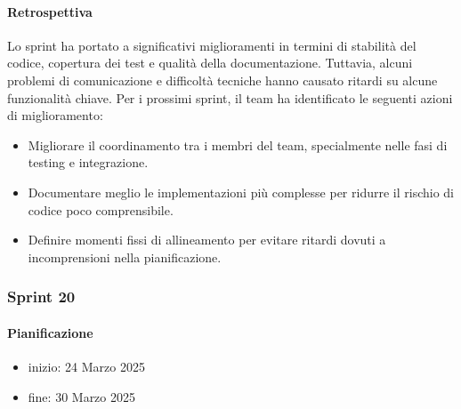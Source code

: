 \documentclass{article}
\begin{document}
            \paragraph{Retrospettiva}
            Lo sprint ha portato a significativi miglioramenti in termini di stabilità del codice, copertura dei test e qualità della documentazione. Tuttavia, alcuni problemi di comunicazione e difficoltà tecniche hanno causato ritardi su alcune funzionalità chiave. Per i prossimi sprint, il team ha identificato le seguenti azioni di miglioramento:
            \begin{itemize}
                \item Migliorare il coordinamento tra i membri del team, specialmente nelle fasi di testing e integrazione.
                \item Documentare meglio le implementazioni più complesse per ridurre il rischio di codice poco comprensibile.
                \item Definire momenti fissi di allineamento per evitare ritardi dovuti a incomprensioni nella pianificazione.
            \end{itemize}
                
            \subsubsection{Sprint 20}
            \paragraph{Pianificazione}
                \begin{itemize}
                    \item inizio: 24 Marzo 2025
                    \item fine: 30 Marzo 2025
                \end{itemize}
            
\end{document}
